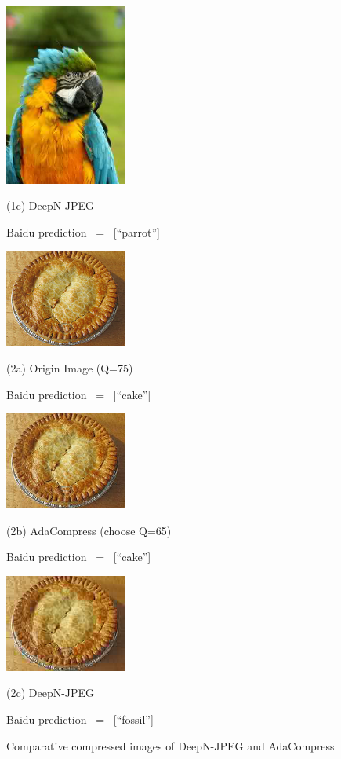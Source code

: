 \begin{figure}[!t]
\begin{minipage}{0.3\linewidth}
		\centerline{\includegraphics[width=4.0cm,trim=0 80 0 100,clip ]{figures/parrot_deepn.jpeg}}
		\centerline{(1c) DeepN-JPEG}
		\centerline{Baidu prediction \ = \ [``parrot'']}
	\end{minipage}
	
	\vfill
	\vspace{0.4cm}
	
	\begin{minipage}{0.3\linewidth}
		\centerline{\includegraphics[width=4.0cm,trim=0 0 0 0,clip ]{figures/cake_q75.jpeg}}
		\centerline{(2a) Origin Image (Q=75)}
		\centerline{Baidu prediction \ = \ [``cake'']}
	\end{minipage}
	\hfill
	\begin{minipage}{0.2\linewidth}
		\centerline{\includegraphics[width=4.0cm,trim=0 0 0 0,clip ]{figures/cake_q65.jpeg}}
		\centerline{(2b) AdaCompress (choose Q=65)}
		\centerline{Baidu prediction \ = \ [``cake'']}
	\end{minipage}
	\hfill
	\begin{minipage}{0.3\linewidth}
		\centerline{\includegraphics[width=4.0cm,trim=0 0 0 0,clip ]{figures/cake_deepn.jpeg}}
		\centerline{(2c) DeepN-JPEG}
		\centerline{Baidu prediction \ = \ [``fossil'']}
	\end{minipage}
	\caption{Comparative compressed images of DeepN-JPEG and AdaCompress}
	\label{fig: compare_image}
\end{figure}

